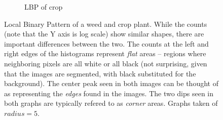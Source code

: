 \documentclass[letterpaper]{article}
\begin{document}
{\begin{figure}[H]
\begin{subfigure}{0.48\linewidth}
		\caption{LBP of crop}
		\label{subfig:lbp-crop}		
	\end{subfigure}%
	\caption[Local Binary Pattern of a weed and crop plant]{Local Binary Pattern of a weed and crop plant. While the counts (note that the Y axis is log scale) show similar shapes, there are important differences between the two. The counts at the left and right edges of the histograms represent \textit{flat} areas -- regions where neighboring pixels are all white or all black (not surprising, given that the images are segmented, with black substituted for the background). The center peak seen in both images can be thought of as representing the \textit{edges} found in the images. The two dips seen in both graphs are typically refered to as \textit{corner} areas. Graphs taken of $radius=5$.}
	\label{fig:lbp}
\end{figure}

}
\end{document}
